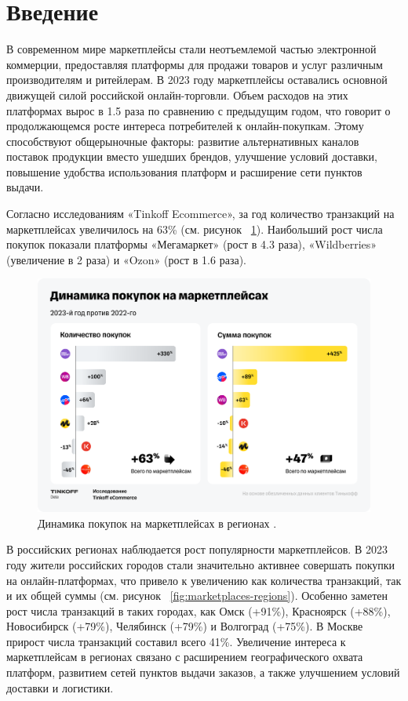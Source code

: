 \documentclass[a4paper,12pt]{extarticle}
\begin{document}
\newpage
\section*{Введение}   %
В современном мире маркетплейсы стали неотъемлемой частью электронной коммерции, предоставляя платформы для продажи товаров и услуг различным производителям и ритейлерам.
В 2023 году маркетплейсы оставались основной движущей силой российской онлайн-торговли. Объем расходов на этих платформах вырос в 1.5 раза по сравнению с предыдущим годом, что говорит о продолжающемся росте интереса потребителей к онлайн-покупкам. Этому способствуют общерыночные факторы: развитие альтернативных каналов поставок продукции вместо ушедших брендов, улучшение условий доставки, повышение удобства использования платформ и расширение сети пунктов выдачи.

Согласно исследованиям «Tinkoff Ecommerce»\cite{tinkoffresearch}, за год количество транзакций на маркетплейсах увеличилось на 63\% (см. рисунок ~\ref{fig:marketplaces-purchases-increased}). Наибольший рост числа покупок показали платформы «Мегамаркет» (рост в 4.3 раза), «Wildberries» (увеличение в 2 раза) и «Ozon» (рост в 1.6 раза).

\begin{figure}[hbtp]
	\centering
	\includegraphics[scale=0.3]{marketplaces-purchases-increased.png}
	\caption{Динамика покупок на маркетплейсах в регионах \cite{tinkoffresearch}.}
	\label{fig:marketplaces-purchases-increased}
\end{figure} 

В российских регионах наблюдается рост популярности маркетплейсов. В 2023 году жители российских городов стали значительно активнее совершать покупки на онлайн-платформах, что привело к увеличению как количества транзакций, так и их общей суммы (см. рисунок ~\ref{fig:marketplaces-regions}). Особенно заметен рост числа транзакций в таких городах, как Омск (+91\%), Красноярск (+88\%), Новосибирск (+79\%), Челябинск (+79\%) и Волгоград (+75\%). В Москве прирост числа транзакций составил всего 41\%. Увеличение интереса к маркетплейсам в регионах связано с расширением географического охвата платформ, развитием сетей пунктов выдачи заказов, а также улучшением условий доставки и логистики.
\end{document}
